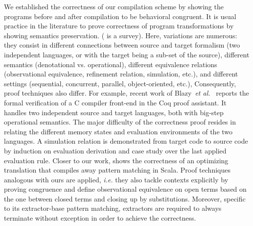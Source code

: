 \documentclass{LMCS}
\makeatletter
\newcommand{\etal}{\emph{et al.}\@\xspace}
\newcommand{\ie}{\emph{i.e.}\@\xspace}
\newcommand{\scala}{\textrm{Scala}\xspace}
\renewcommand{\_}{\mathord{\rule[-.25ex]{1ex}{.15ex}}}
\makeatother
\begin{document}
We established the correctness of our compilation scheme by showing
the programs before and after compilation to be behavioral congruent. It is
usual practice in the literature to prove correctness of program
transformations by showing semantics preservation.
(\cite{DaveCompVeriSurvey} is a survey).
Here, variations are numerous:
they consist in different connections between source and
target formalism (two independent languages, or with the target being
a sub-set of the source), different semantics (denotational vs.
operational), different equivalence relations (observational
equivalence, refinement relation, simulation, etc.), and different
settings (sequential, concurrent, parallel, object-oriented, etc.),
Consequently, proof techniques also differ.
For example, recent work of Blazy~\etal~\cite{Blazy-Dargaye-Leroy-06}
reports the formal verification of a C compiler front-end in the Coq
proof assistant. It handles two independent source and target
languages, both with big-step operational semantics. The major
difficulty of the correctness proof resides in relating the different
memory states and evaluation environments of the two languages. A
simulation relation is demonstrated from target code to source code by
induction on evaluation derivation and case study over the last
applied evaluation rule.
Closer to our work, \cite{EmirMaOdersky2007} shows the correctness
of an optimizing translation that compiles away pattern matching in
\scala. Proof techniques analogous with ours are applied, \ie they
also tackle contexts explicitly by proving congruence and define
observational equivalence on open terms based on the one between
closed terms and closing up by substitutions. Moreover, specific to
its extractor-base pattern matching, extractors are required to always
terminate without exception in order to achieve the correctness.
\end{document}
